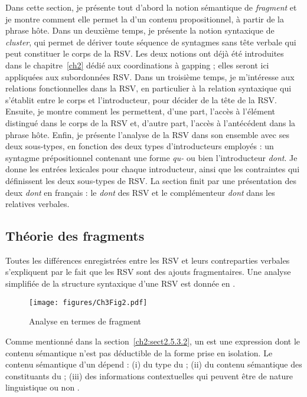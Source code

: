 Dans cette section, je présente tout d’abord la notion sémantique de \textit{fragment} et je montre comment elle permet la  d’un contenu propositionnel, à partir de la phrase hôte. Dans un deuxième temps, je présente la notion syntaxique de \textit{cluster}, qui permet de dériver toute séquence de syntagmes sans tête verbale qui peut constituer le corps de la RSV. Les deux notions ont déjà été introduites dans le chapitre~\ref{ch2} dédié aux coordinations à gapping ; elles seront ici appliquées aux subordonnées RSV. Dans un troisième temps, je m’intéresse aux relations fonctionnelles dans la RSV, en particulier à la relation syntaxique qui s’établit entre le corps et l’introducteur, pour décider de la tête de la RSV. Ensuite, je montre comment les  permettent, d’une part, l’accès à l’élément distingué dans le corps de la RSV et, d’autre part, l’accès à l’antécédent dans la phrase hôte. Enfin, je présente l’analyse de la RSV dans son ensemble avec ses deux sous-types, en fonction des deux types d’introducteurs employés : un syntagme prépositionnel contenant une forme \textit{qu-} ou bien l’introducteur \textit{dont}. Je donne les entrées lexicales pour chaque introducteur, ainsi que les contraintes qui définissent les deux sous-types de RSV. La section finit par une présentation des deux \textit{dont} en français : le \textit{dont} des RSV et le complémenteur \textit{dont} dans les relatives verbales. 


\subsection{Théorie des fragments}\label{ch3:sect3.5.1}
 
Toutes les différences enregistrées entre les RSV et leurs contreparties verbales s’expliquent par le fait que les RSV sont des ajouts fragmentaires. Une analyse simplifiée de la structure syntaxique d’une RSV est donnée en .

\begin{figure}
\texttt{[image: figures/Ch3Fig2.pdf]} %
\caption{Analyse en termes de fragment}
\label{ch3:fig2}
\end{figure} 

Comme mentionné dans la section~\ref{ch2:sect2.5.3.2}, un  est une expression dont le contenu sémantique n’est pas déductible de la forme prise en isolation. Le contenu sémantique d’un  dépend : (i) du type du  ; (ii) du contenu sémantique des constituants du  ; (iii) des informations contextuelles qui peuvent être de nature linguistique ou non \citep{GinzburgEtAl2000,FernandezEtAl2007}. 

